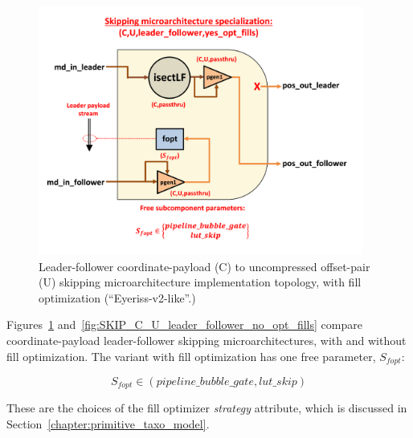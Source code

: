 \begin{figure}[H]
    \centering
    \includegraphics[width=0.95\textwidth]{figures/SKIP_C_U_leader_follower_yes_opt_fills.png}
    \caption{Leader-follower coordinate-payload (C) to uncompressed offset-pair (U) skipping microarchitecture implementation topology, with fill optimization (``Eyeriss-v2-like''\cite{eyerissv2}.)}
    \label{fig:SKIP_C_U_leader_follower_yes_opt_fills}
\end{figure}

Figures~\ref{fig:SKIP_C_U_leader_follower_yes_opt_fills} and~\ref{fig:SKIP_C_U_leader_follower_no_opt_fills} compare coordinate-payload leader-follower skipping microarchitectures, with and without fill optimization. The variant with fill optimization has one free parameter, $S_{fopt}$:

\[S_{fopt} \in (pipeline\_bubble\_gate,lut\_skip)\]

These are the choices of the fill optimizer \textit{strategy} attribute, which is discussed in Section~\ref{chapter:primitive_taxo_model}.

